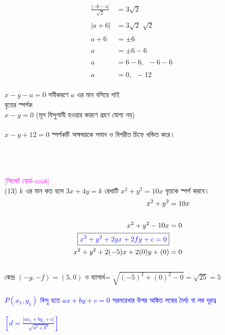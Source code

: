 \documentclass{article}
\begin{document}
	\\ 
	\begin{align*}
		\frac{|-6-a|}{\sqrt{2}}&=3\sqrt{2}\\
		\\
		|a+6|&=3\sqrt{2}\,\,\sqrt{2}\\
		\\
		a+6&=\pm 6\\
		\\
		a&=\pm 6-6\\
		\\
		a&=6-6,\,\,\,-6-6\\
		\\
		a&=0,\,\,\,-12
	\end{align*}
	\\
	$x-y-a=0$ সমীকরণে  $a$ এর মান বসিয়ে পাই\\  
	বৃত্তের স্পর্শক \\ 
	$x-y=0$ (মূল বিন্দুগামী হওয়ার কারণে গ্রহণ যোগ্য নয়)\\
	\\
	$x-y+12=0$ স্পর্শকটি অক্ষদ্বয়কে সমান ও বিপরীত চিহ্নে খন্ডিত করে। \\ 
	\\
\\
\\
	\textcolor{magenta}{[সিলেট বোর্ড-২০১৪]}\\
(13)	$k$ এর মান কত হলে  $3x+4y=k$ রেখাটি $x^2+y^2=10x$ বৃত্তকে স্পর্শ করবে। \\
	\begin{align*}
		x^2+y^2&=10x\\
		\\
		x^2+y^2-10x&=0\\
		\boxed{\textcolor{blue}{x^2+y^2+2gx+2fy+c=0}}&\\
		x^2+y^2+2(-5)x+2(0)y+(0)&=0
	\end{align*}
	\\
	কেন্দ্র 	$(-g,-f)=(5,0)$ ও ব্যাসার্ধ= $\sqrt{(-5)^2+(0)^2-0}=\sqrt{25}=5$\\
	\\  
	\textcolor{blue}{$P(x_1,y_1)$ বিন্দু হতে  $ax+by+c=0$ সরলরেখার উপর অঙ্কিত লম্বের দৈর্ঘ্য বা লম্ব দূরত্ব \\
		\\
		$\left[d=\frac{|ax_1+by_1+c|}{\sqrt{a^2+b^2}}\right]$}\\
\end{document}
